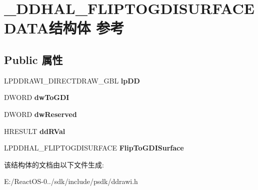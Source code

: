 \hypertarget{struct___d_d_h_a_l___f_l_i_p_t_o_g_d_i_s_u_r_f_a_c_e_d_a_t_a}{}\section{\+\_\+\+D\+D\+H\+A\+L\+\_\+\+F\+L\+I\+P\+T\+O\+G\+D\+I\+S\+U\+R\+F\+A\+C\+E\+D\+A\+T\+A结构体 参考}
\label{struct___d_d_h_a_l___f_l_i_p_t_o_g_d_i_s_u_r_f_a_c_e_d_a_t_a}
\subsection*{Public 属性}
\begin{DoxyCompactItemize}
\item 
\mbox{\label{struct___d_d_h_a_l___f_l_i_p_t_o_g_d_i_s_u_r_f_a_c_e_d_a_t_a_a9a780cdd547bd255cfa4df8352a732de}} 
L\+P\+D\+D\+R\+A\+W\+I\+\_\+\+D\+I\+R\+E\+C\+T\+D\+R\+A\+W\+\_\+\+G\+BL {\bfseries lp\+DD}
\item 
\mbox{\label{struct___d_d_h_a_l___f_l_i_p_t_o_g_d_i_s_u_r_f_a_c_e_d_a_t_a_a511677d71e80a4cdbc1b4a3a6f333676}} 
D\+W\+O\+RD {\bfseries dw\+To\+G\+DI}
\item 
\mbox{\label{struct___d_d_h_a_l___f_l_i_p_t_o_g_d_i_s_u_r_f_a_c_e_d_a_t_a_a6b6ae6745331be22a8fe0580143f3401}} 
D\+W\+O\+RD {\bfseries dw\+Reserved}
\item 
\mbox{\label{struct___d_d_h_a_l___f_l_i_p_t_o_g_d_i_s_u_r_f_a_c_e_d_a_t_a_a0a4c6c0b3ce0d3283e94ee7c2814a65b}} 
H\+R\+E\+S\+U\+LT {\bfseries dd\+R\+Val}
\item 
\mbox{\label{struct___d_d_h_a_l___f_l_i_p_t_o_g_d_i_s_u_r_f_a_c_e_d_a_t_a_a152b9715a48de2021c5d2868175bc6cb}} 
L\+P\+D\+D\+H\+A\+L\+\_\+\+F\+L\+I\+P\+T\+O\+G\+D\+I\+S\+U\+R\+F\+A\+CE {\bfseries Flip\+To\+G\+D\+I\+Surface}
\end{DoxyCompactItemize}


该结构体的文档由以下文件生成\+:\begin{DoxyCompactItemize}
\item 
E\+:/\+React\+O\+S-\/0../sdk/include/psdk/ddrawi.\+h\end{DoxyCompactItemize}
